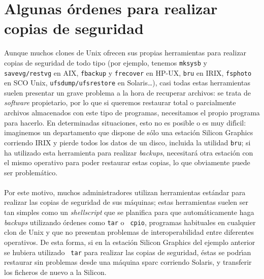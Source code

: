\section{Algunas \'ordenes para realizar copias de seguridad}
Aunque muchos clones de Unix ofrecen sus propias herramientas para realizar
copias de seguridad de todo tipo (por ejemplo, tenemos {\tt mksysb} y {\tt 
savevg/restvg} en AIX, {\tt fbackup} y {\tt frecover} en HP-UX, {\tt bru} en
IRIX, {\tt fsphoto} en SCO Unix, {\tt ufsdump/ufsrestore} en Solaris\ldots), 
casi todas estas herramientas suelen presentar un
grave problema a la hora de recuperar archivos: se trata de {\it software}
propietario, por lo que si queremos restaurar total o parcialmente archivos 
almacenados con este tipo de programas, necesitamos el propio programa para 
hacerlo. En determinadas situaciones, esto no es posible o es muy dif\'{\i}cil: 
imaginemos un departamento que dispone de s\'olo una estaci\'on Silicon 
Graphics corriendo IRIX y pierde todos los datos de un disco, incluida la 
utilidad {\tt bru}; si ha utilizado esta herramienta para realizar {\it 
backups}, necesitar\'a otra estaci\'on con el mismo operativo para poder 
restaurar estas copias, lo que obviamente puede ser problem\'atico.\\
\\Por este motivo, muchos administradores utilizan herramientas est\'andar para
realizar las copias de seguridad de sus m\'aquinas; estas herramientas suelen
ser tan simples como un {\it shellscript} que se planifica para que 
autom\'aticamente haga {\it backups} utilizando \'ordenes como {\tt tar} o {\tt 
cpio}, programas habituales en cualquier clon de Unix y que no presentan 
problemas de interoperabilidad entre diferentes operativos. De esta forma, si en
la estaci\'on Silicon Graphics del ejemplo anterior se hubiera utilizado {\tt
tar} para realizar las copias de seguridad, \'estas se podr\'{\i}an restaurar
sin problemas desde una m\'aquina {\sc sparc} corriendo Solaris, y transferir
los ficheros de nuevo a la Silicon.
